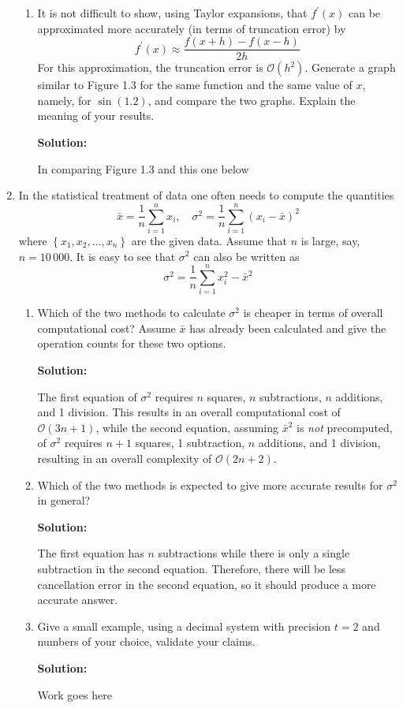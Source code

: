 \documentclass[12pt]{article}
\begin{document}
\begin{enumerate}
\begin{enumerate}
\item It is not difficult to show, using Taylor expansions, that $f^{\prime}(x)$ can
be approximated more accurately (in terms of truncation error) by
\[
f^{\prime}(x) \approx \frac{f(x+h) - f(x-h)}{2h}
\]
For this approximation, the truncation error is $\mathcal{O}\left(h^{2}\right)$.
Generate a graph similar to Figure 1.3 for the same function and the same value
of $x$, namely, for $\sin(1.2)$, and compare the two graphs. Explain the meaning
of your results.

{\bf Solution:}

In comparing Figure 1.3 and this one below
\end{enumerate}

\item In the statistical treatment of data one often needs to compute the quantities
\[
\bar{x} = \frac{1}{n}\sum_{i=1}^{n}x_{i},\quad \sigma^{2}=\frac{1}{n}\sum_{i=1}^{n}\left(x_{i}-\bar{x}\right)^{2}
\]
where $\left\{ x_{1}, x_{2}, \ldots, x_{n}\right\}$ are the given data. Assume that $n$
is large, say, $n = 10\,000$. It is easy to see that $\sigma^{2}$ can also be written as
\[
\sigma^{2} = \frac{1}{n}\sum_{i=1}^{n} x_{i}^{2} - \bar{x}^{2}
\]
\begin{enumerate}
\item Which of the two methods to calculate $\sigma^{2}$ is cheaper in terms of
overall computational cost? Assume $\bar{x}$ has already been calculated and give
the operation counts for these two options.

{\bf Solution:}

The first equation of $\sigma^{2}$ requires $n$ squares, $n$ subtractions, $n$ additions, and 1 division.
This results in an overall computational cost of $\mathcal{O}(3n+1)$, while the second
equation, assuming $\bar{x}^{2}$ is {\em not} precomputed,
of $\sigma^{2}$ requires $n+1$ squares, 1 subtraction, $n$ additions, and 1 division,
resulting in an overall complexity of $\mathcal{O}(2n+2)$.

\item Which of the two methods is expected to give more accurate results for
$\sigma^{2}$ in general?

{\bf Solution:}

The first equation has $n$ subtractions while there is only a single subtraction
in the second equation. Therefore, there will be less cancellation error in the
second equation, so it should produce a more accurate answer.

\item Give a small example, using a decimal system with precision $t = 2$ and
numbers of your choice, validate your claims.

{\bf Solution:}

Work goes here
\end{enumerate}
\end{enumerate}
\end{document}
